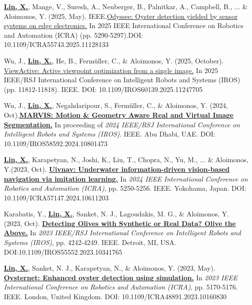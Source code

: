 \documentclass[a4paper,11pt]{article}
\begin{document}
\item[\textbf{[C.7]}] \textbf{\underline{Lin, X.}}, Mange, V., Suresh, A., Neuberger, B., Palnitkar, A., Campbell, B., ... \& Aloimonos, Y. (2025, May). IEEE.\href{https://ieeexplore.ieee.org/document/11128133}{Odyssee: Oyster detection yielded by sensor systems on edge electronics.} In 2025 IEEE International Conference on Robotics and Automation (ICRA) (pp. 5290-5297).DOI: 10.1109/ICRA55743.2025.11128133

\item[\textbf{[C.6]}] Wu, J., \textbf{\underline{Lin, X.}}, He, B., Fermüller, C., \& Aloimonos, Y. (2025, October). \href{https://ieeexplore.ieee.org/abstract/document/11247705}{ViewActive: Active viewpoint optimization from a single image.} In 2025 IEEE/RSJ International Conference on Intelligent Robots and Systems (IROS) (pp. 11812-11818). IEEE. DOI: 10.1109/IROS60139.2025.11247705

\item[\textbf{[C.5]}] Wu, J., \textbf{\underline{Lin, X.}}, Negahdaripour, S., Fermüller, C., \& Aloimonos, Y. (2024, Oct).\href{https://arxiv.org/pdf/2403.09850}{\textbf{MARVIS: Motion \& Geometry Aware Real and Virtual Image Segmentation.}} In proceeding of \textit{2024 IEEE/RSJ International Conference on Intelligent Robots and Systems (IROS)}. IEEE. Abu Dhabi, UAE. DOI: 10.1109/IROS58592.2024.10801473

\item[\textbf{[C.4]}] \textbf{\underline{Lin, X.}}, Karapetyan, N., Joshi, K., Liu, T., Chopra, N., Yu, M., ... \& Aloimonos, Y.(2023, Oct). \href{https://doi.org/10.1109/ICRA57147.2024.10611203}{\textbf{Uivnav: Underwater information-driven vision-based navigation via imitation learning.}} In \textit{2024 IEEE International Conference on Robotics and Automation (ICRA)}, pp. 5250-5256. IEEE. Yokohama, Japan. DOI: 10.1109/ICRA57147.2024.10611203

\item[\textbf{[C.3]}] Karabatis, Y., \textbf{\underline{Lin, X.}}, Sanket, N. J., Lagoudakis, M. G., \& Aloimonos, Y. (2023, Oct). \href{https://doi.org/10.1109/IROS55552.2023.103417650}{\textbf{Detecting Olives with Synthetic or Real Data? Olive the Above.}} In \textit{2023 IEEE/RSJ International Conference on Intelligent Robots and Systems (IROS)}, pp. 4242-4249. IEEE. Detroit, MI, USA. DOI:10.1109/IROS55552.2023.10341765

\item[\textbf{[C.2]}] \textbf{\underline{Lin, X.}}, Sanket, N. J., Karapetyan, N., \& Aloimonos, Y. (2023, May). \href{https://doi.org/10.1109/ICRA48891.2023.10160830}{\textbf{Oysternet: Enhanced oyster detection using simulation.}} In \textit{2023 IEEE International Conference on Robotics and Automation (ICRA)}, pp. 5170-5176. IEEE. London, United Kingdom. DOI: 10.1109/ICRA48891.2023.10160830
\end{document}
